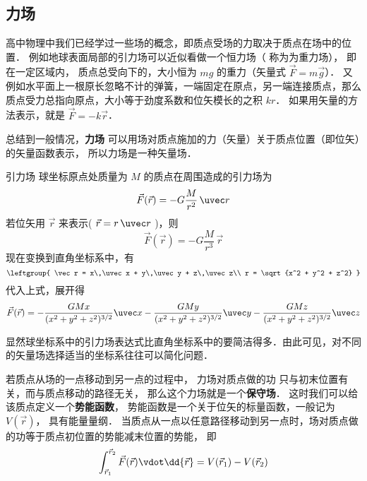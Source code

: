 

\subsection{力场}
高中物理中我们已经学过一些场的概念，即质点受场的力取决于质点在场中的位置． 例如地球表面局部的引力场可以近似看做一个恒力场（ 称为为重力场）， 即在一定区域内， 质点总受向下的，大小恒为 $mg$ 的重力（矢量式 $\vec F = m\vec g$）． 又例如水平面上一根原长忽略不计的弹簧，一端固定在原点，另一端连接质点，那么质点受力总指向原点，大小等于劲度系数和位矢模长的之积 $kr$． 如果用矢量的方法表示，就是 $\vec F = -k\vec r$．

总结到一般情况，\textbf{力场} 可以用场对质点施加的力（矢量）关于质点位置（即位矢）的矢量函数表示， 所以力场是一种矢量场．


\begin{exam}{引力场}\label{V_ex1}
球坐标原点处质量为 $M$ 的质点在周围造成的引力场为
\begin{equation}
\vec F(\vec r) =  - G\frac{M}{r^2}\,\uvec r
\end{equation} 
若位矢用 $\vec r$ 来表示( $\vec r = r\,\uvec r$ )，则
\begin{equation}
\vec F(\vec r) =  - G\frac{M}{r^3}\,\vec r
\end{equation}
现在变换到直角坐标系中，有
\begin{equation}
\leftgroup{
\vec r = x\,\uvec x + y\,\uvec y + z\,\uvec z\\
r = \sqrt{x^2 + y^2 + z^2} 
}\end{equation} 
代入上式，展开得
\begin{equation}
\vec F(\vec r) =  - \frac{GMx}{(x^2+y^2+z^2)^{3/2}}\uvec x - \frac{GMy}{(x^2 +y^2+z^2)^{3/2}}\uvec y - \frac{GMz}{(x^2+y^2+z^2)^{3/2}}\uvec z 
\end{equation} 

显然球坐标系中的引力场表达式比直角坐标系中的要简洁得多．由此可见，对不同的矢量场选择适当的坐标系往往可以简化问题．
\end{exam}

若质点从场的一点移动到另一点的过程中， 力场对质点做的功 只与初末位置有关，而与质点移动的路径无关， 那么这个力场就是一个\textbf{保守场}． 这时我们可以给该质点定义一个\textbf{势能函数}， 势能函数是一个关于位矢的标量函数，一般记为 $V(\vec r)$， 具有能量量纲． 当质点从一点以任意路径移动到另一点时，场对质点做的功等于质点初位置的势能减末位置的势能， 即
\begin{equation}\label{V_eq1}
\int_{\vec r_1}^{\vec r_2} \vec F(\vec r) \vdot \dd{\vec r} = V(\vec r_1)-V(\vec r_2)
\end{equation}

